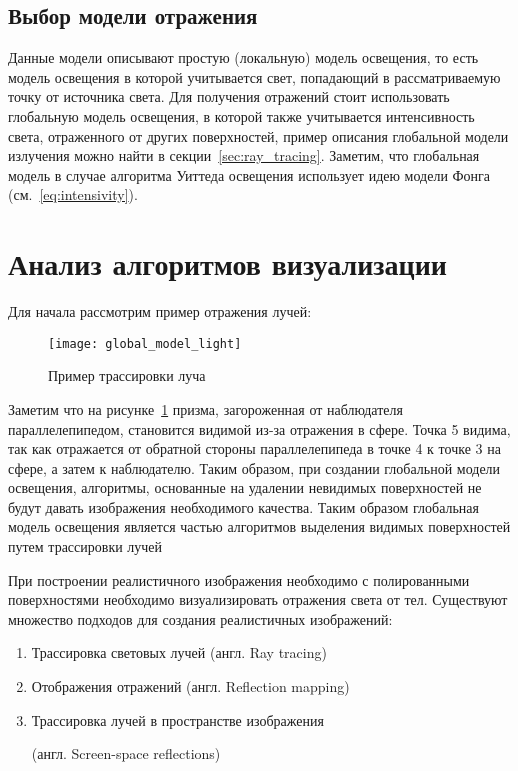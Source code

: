 \subsection{Выбор модели отражения}
Данные модели описывают простую (локальную) модель освещения, то есть модель освещения в которой учитывается свет, попадающий в рассматриваемую точку от источника света.
Для получения отражений стоит использовать глобальную модель освещения, в которой также учитывается интенсивность света, отраженного от других поверхностей, пример описания глобальной модели излучения можно найти в секции~\ref{sec:ray_tracing}.
Заметим, что глобальная модель в случае алгоритма Уиттеда освещения использует идею модели Фонга (см.~\ref{eq:intensivity}).






\section[Анализ алгоритмов создания отражений]{Анализ алгоритмов визуализации}

Для начала рассмотрим пример отражения лучей:

\begin{figure}[H]
	\centering
	\texttt{[image: global\_model\_light]}
	\caption{Пример трассировки луча}
	\label{fig:global_model_light}
\end{figure} 

Заметим что на рисунке~\ref{fig:global_model_light}  призма, загороженная от наблюдателя параллелепипедом, становится видимой из-за отражения в сфере.
Точка 5 видима, так как отражается от обратной стороны параллелепипеда в точке 4 к точке 3 на сфере, а затем к наблюдателю.
Таким образом, при создании глобальной модели освещения, алгоритмы, основанные на удалении невидимых поверхностей не будут давать изображения необходимого качества.
Таким образом глобальная модель освещения является частью алгоритмов выделения видимых поверхностей путем трассировки лучей\cite{Rodgers}


При построении реалистичного изображения необходимо с полированными поверхностями необходимо визуализировать отражения света от тел.
Существуют множество подходов для создания реалистичных изображений:
\begin{enumerate}
	\item Трассировка световых лучей (англ. Ray tracing)
	\item Отображения отражений (англ. Reflection mapping)
	\item Трассировка лучей в пространстве изображения 
	
	(англ. Screen-space reflections)
\end{enumerate}





